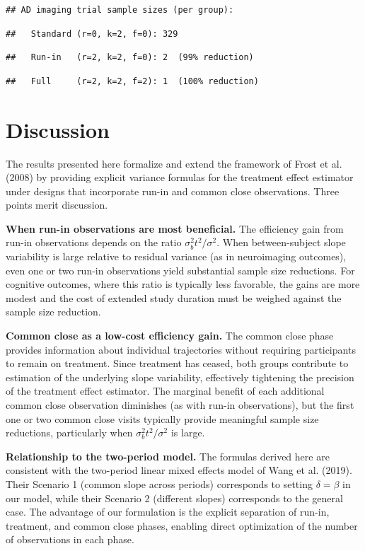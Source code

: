 \documentclass[
]{article}
\begin{document}
\begin{verbatim}
## AD imaging trial sample sizes (per group):
\end{verbatim}

\begin{verbatim}
##   Standard (r=0, k=2, f=0): 329
\end{verbatim}

\begin{verbatim}
##   Run-in   (r=2, k=2, f=0): 2  (99% reduction)
\end{verbatim}

\begin{verbatim}
##   Full     (r=2, k=2, f=2): 1  (100% reduction)
\end{verbatim}

\section{Discussion}\label{discussion}

The results presented here formalize and extend the framework of Frost
et al. (2008) by providing explicit variance formulas for the treatment
effect estimator under designs that incorporate run-in and common close
observations. Three points merit discussion.

\textbf{When run-in observations are most beneficial.} The efficiency
gain from run-in observations depends on the ratio
\(\sigma_b^2 t^2 / \sigma^2\). When between-subject slope variability is
large relative to residual variance (as in neuroimaging outcomes), even
one or two run-in observations yield substantial sample size reductions.
For cognitive outcomes, where this ratio is typically less favorable,
the gains are more modest and the cost of extended study duration must
be weighed against the sample size reduction.

\textbf{Common close as a low-cost efficiency gain.} The common close
phase provides information about individual trajectories without
requiring participants to remain on treatment. Since treatment has
ceased, both groups contribute to estimation of the underlying slope
variability, effectively tightening the precision of the treatment
effect estimator. The marginal benefit of each additional common close
observation diminishes (as with run-in observations), but the first one
or two common close visits typically provide meaningful sample size
reductions, particularly when \(\sigma_b^2 t^2 / \sigma^2\) is large.

\textbf{Relationship to the two-period model.} The formulas derived here
are consistent with the two-period linear mixed effects model of Wang et
al. (2019). Their Scenario 1 (common slope across periods) corresponds
to setting \(\delta = \beta\) in our model, while their Scenario 2
(different slopes) corresponds to the general case. The advantage of our
formulation is the explicit separation of run-in, treatment, and common
close phases, enabling direct optimization of the number of observations
in each phase.
\end{document}
